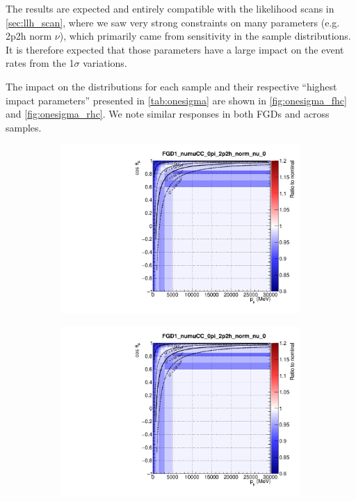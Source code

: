 The results are expected and entirely compatible with the likelihood scans in \autoref{sec:llh_scan}, where we saw very strong constraints on many parameters (e.g. 2p2h norm $\nu$), which primarily came from sensitivity in the sample distributions. It is therefore expected that those parameters have a large impact on the event rates from the 1$\sigma$ variations.

The impact on the \pmu \cosmu distributions for each sample and their respective ``highest impact parameters'' presented in \autoref{tab:onesigma} are shown in \autoref{fig:onesigma_fhc} and \autoref{fig:onesigma_rhc}. We note similar responses in both FGDs and across samples.

\begin{figure}[!h]
	\begin{subfigure}[t]{0.24\textwidth}
	\includegraphics[width=\textwidth,page=1]{figures/mach3/sigmavar/Full_1sigmaVar_18July_BeRPA_U_ND280_sigmavar_highest_all}
	\end{subfigure}
	\begin{subfigure}[t]{0.24\textwidth}
	\includegraphics[width=\textwidth,page=2]{figures/mach3/sigmavar/Full_1sigmaVar_18July_BeRPA_U_ND280_sigmavar_highest_all}

\end{subfigure}
\end{figure}
